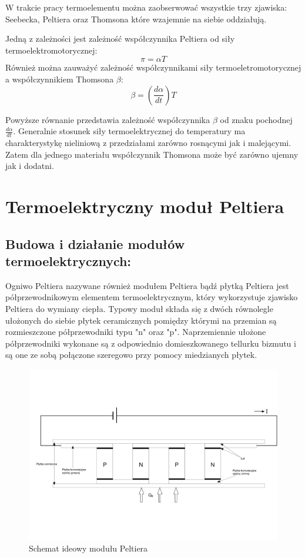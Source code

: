 \documentclass[oneside]{mgr}
\begin{document}
W trakcie pracy termoelementu można zaobserwować wszystkie trzy zjawiska: Seebecka, Peltiera oraz Thomsona które wzajemnie na siebie oddziałują.

Jedną z zależności jest zależność współczynnika Peltiera od siły termoelektromotorycznej:
\begin{equation}
    \pi = \alpha T
\end{equation}
Również można zauważyć zależność współczynnikami siły termoeletromotorycznej a współczynnikiem Thomsona $\beta$:
\begin{equation}
    \beta = (\frac{d\alpha}{dt})T
\end{equation}

Powyższe równanie przedstawia zależność współczynnika $\beta$ od znaku pochodnej $\frac{d\alpha}{dt}$. Generalnie stosunek siły termoelektrycznej do temperatury ma charakterystykę nieliniową z przedziałami zarówno rosnącymi jak i malejącymi. Zatem dla jednego materiału współczynnik Thomsona może być zarówno ujemny jak i dodatni.

\section{Termoelektryczny moduł Peltiera}
\subsection{Budowa i działanie modułów termoelektrycznych:}
Ogniwo Peltiera nazywane również modułem Peltiera bądź płytką Peltiera jest półprzewodnikowym elementem termoelektrycznym, który wykorzystuje zjawisko Peltiera do wymiany ciepła. Typowy moduł składa się z dwóch równolegle ułożonych do siebie płytek ceramicznych pomiędzy którymi na przemian są rozmieszczone półprzewodniki typu "n" oraz "p". Naprzemiennie ułożone półprzewodniki wykonane są z odpowiednio domieszkowanego tellurku bizmutu i są one ze sobą połączone szeregowo przy pomocy miedzianych płytek.

\begin{figure}[h]
    \centering
    \includegraphics[width=\textwidth]{modul_peltiera.jpg}
    \caption{Schemat ideowy modułu Peltiera}
\end{figure}
\end{document}
